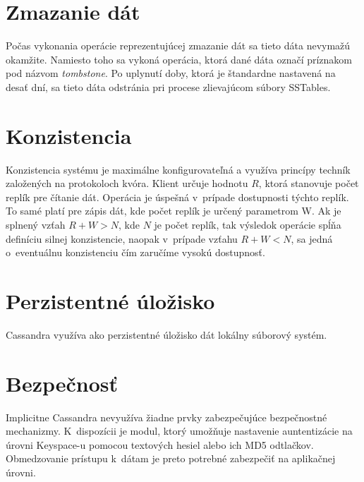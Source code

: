 \documentclass[11pt,twoside,a4paper]{book}
\begin{document}
\section{Zmazanie dát}
Počas vykonania operácie reprezentujúcej zmazanie dát sa tieto dáta nevymažú okamžite. Namiesto toho sa vykoná operácia, ktorá dané dáta označí príznakom pod názvom \emph{tombstone}. Po uplynutí doby, ktorá je štandardne nastavená na desať dní, sa tieto dáta odstránia pri procese zlievajúcom súbory SSTables.
 

\section{Konzistencia}

Konzistencia systému je maximálne konfigurovateľná a využíva princípy techník založených na protokoloch kvóra. Klient určuje hodnotu $R$, ktorá stanovuje počet replík pre čítanie dát. Operácia je úspešná v~prípade dostupnosti týchto replík. To samé platí pre zápis dát, kde počet replík je určený parametrom W. Ak je splnený vzťah $R + W > N$, kde $N$ je počet replík, tak výsledok operácie spĺňa definíciu silnej konzistencie, naopak v~prípade vzťahu $R + W < N$, sa jedná o~eventuálnu konzistenciu čím zaručíme vysokú dostupnosť.


\section{Perzistentné úložisko}

Cassandra využíva ako perzistentné úložisko dát lokálny súborový systém.


\section{Bezpečnosť}

Implicitne Cassandra nevyužíva žiadne prvky zabezpečujúce bezpečnostné mechanizmy. K~dispozícii je modul, ktorý umožňuje nastavenie auntentizácie na úrovni Keyspace-u pomocou textových hesiel alebo ich MD5 odtlačkov. Obmedzovanie prístupu k~dátam je preto potrebné zabezpečiť na aplikačnej úrovni.



\end{document}
